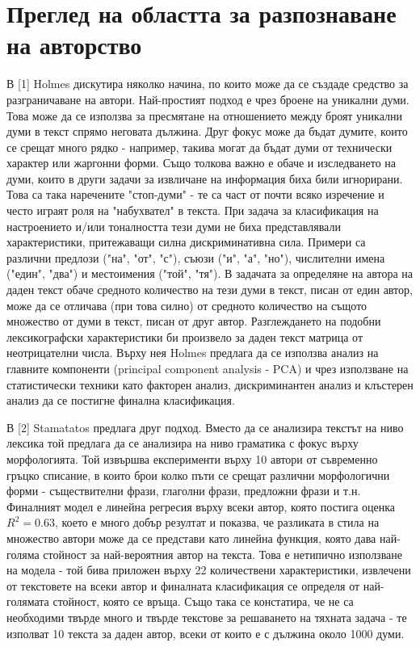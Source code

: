 \documentclass[12pt]{article}
\begin{document}

\section{Преглед на областта за разпознаване на авторство}

В [1] Holmes дискутира няколко начина, по които може да се създаде средство за разграничаване на автори. Най-простият подход е чрез броене на уникални думи. Това може да се използва за пресмятане на отношението между броят уникални думи в текст спрямо неговата дължина. Друг фокус може да бъдат думите, които се срещат много рядко - например, такива могат да бъдат думи от технически характер или жаргонни форми. Също толкова важно е обаче и изследването на думи, които в други задачи за извличане на информация биха били игнорирани. Това са така наречените "стоп-думи" - те са част от почти всяко изречение и често играят роля на "набухвател" в текста. При задача за класификация на настроението и/или тоналността тези думи не биха представлявали характеристики, притежаващи силна дискриминативна сила. Примери са различни предлози ("на", "от", "с"), съюзи ("и", "а", "но"), числителни имена ("един", "два") и местоимения ("той", "тя"). В задачата за определяне на автора на даден текст обаче средното количество на тези думи в текст, писан от един автор, може да се отличава (при това силно) от средното количество на същото множество от думи в текст, писан от друг автор. Разглеждането на подобни лексикографски характеристики би произвело за даден текст матрица от неотрицателни числа. Върху нея Holmes предлага да се използва анализ на главните компоненти (principal component analysis - PCA) и чрез използване на статистически техники като факторен анализ, дискриминантен анализ и клъстерен анализ да се постигне финална класификация.

\vspace{1em}

В [2] Stamatatos предлага друг подход. Вместо да се анализира текстът на ниво лексика той предлага да се анализира на ниво граматика с фокус върху морфологията. Той извършва експерименти върху 10 автори от съвременно гръцко списание, в които брои колко пъти се срещат различни морфологични форми - съществителни фрази, глаголни фрази, предложни фрази и т.н. Финалният модел е линейна регресия върху всеки автор, която постига оценка $R^2 = 0.63$, което е много добър резултат и показва, че разликата в стила на множество автори може да се представи като линейна функция, която дава най-голяма стойност за най-вероятния автор на текста. Това е нетипично използване на модела - той бива приложен върху 22 количествени характеристики, извлечени от текстовете на всеки автор и финалната класификация се определя от най-голямата стойност, която се връща. Също така се констатира, че не са необходими твърде много и твърде текстове за решаването на тяхната задача - те изполват 10 текста за даден автор, всеки от които е с дължина около 1000 думи.
\end{document}
